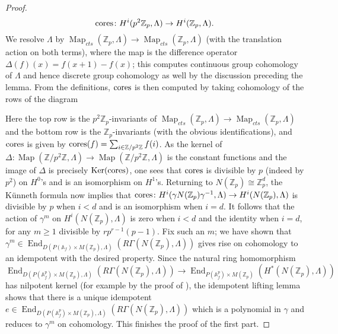 \documentclass{amsart}
\theoremstyle{remark}
\numberwithin{equation}{subsection}
\newcommand{\A}{\AA}
\newcommand{\Z}{\ZZ}
\renewcommand{\AA}{{\mathbb A}}
\newcommand{\ZZ}{{\mathbb Z}}
\newcommand{\Zp}{\Z_p}
\DeclareMathOperator{\End}{End}
\DeclareMathOperator{\Map}{Map}
\renewcommand{\(}{\left(}
\renewcommand{\)}{\right)}
\begin{document}
\begin{proof}
$$ {\rm cores} \colon H^{i}(p^{2}\Zp,\Lambda) \to H^{i}(\Zp,\Lambda). $$
We resolve $\Lambda$ by $\Map_{cts}(\Zp,\Lambda) \to \Map_{cts}(\Zp,\Lambda)$ (with the translation action on both terms), where the map is the difference operator $\Delta(f)(x)=f(x+1)-f(x)$; this computes continuous group cohomology of $\Lambda$ and hence discrete group cohomology as well by the discussion preceding the lemma. From the definitions, ${\rm cores}$ is then computed by taking cohomology of the rows of the diagram
\begin{center}
\end{center}
Here the top row is the $p^{2}\Zp$-invariants of $\Map_{cts}(\Zp,\Lambda) \to \Map_{cts}(\Zp,\Lambda)$ and the bottom row is the $\Zp$-invariants (with the obvious identifications), and ${\rm cores}$ is given by ${\rm cores}(f)=\sum_{i\in \Z/p^{2}\Z}f(i)$. As the kernel of $\Delta \colon \Map(\Z/p^{2}\Z,\Lambda) \to \Map(\Z/p^{2}\Z,\Lambda)$ is the constant functions and the image of $\Delta$ is precisely ${\rm Ker}(\mathrm{cores})$, one sees that ${\rm cores}$ is divisible by $p$ (indeed by $p^{2}$) on $H^{0}$'s and is an isomorphism on $H^{1}$'s. Returning to $N(\Zp)\cong \Zp^{d}$, the K\"unneth formula now implies that $ {\rm cores} \colon H^{i}(\gamma N(\Zp) \gamma^{-1},\Lambda) \to H^{i}(N(\Zp),\Lambda)$ is divisible by $p$ when $i<d$ and is an isomorphism when $i=d$. It follows that the action of $\gamma^m$ on $H^{i}(N(\Zp),\Lambda)$ is zero when $i<d$ and the identity when $i=d$, for any $m\geq 1$ divisible by $rp^{r-1}(p-1)$. Fix such an $m$; we have shown that $\gamma^m \in \End_{D(P(\A_f)\times M(\Zp),\Lambda)}(R\Gamma(N(\Z_p), \Lambda))$ gives rise on cohomology to an idempotent with the desired property. Since the natural ring homomorphism
\[
\End_{D(P(\A_f^p)\times M(\Zp),\Lambda)}(R\Gamma(N(\Z_p), \Lambda)) \to \End_{P(\A_f^p)\times M(\Zp)}(H^{\ast}(N(\Z_p), \Lambda))
\]
has nilpotent kernel (for example by the proof of \cite[Lemma 2.5(2)]{khare-thorne}), the idempotent lifting lemma \cite[Tag 00J9]{stacks-project} shows that there is a unique idempotent $e\in \End_{D(P(\A_f^p)\times M(\Zp),\Lambda)}(R\Gamma(N(\Z_p), \Lambda))$ which is a polynomial in $\gamma$ and reduces to $\gamma^m$ on cohomology. This finishes the proof of the first part.


\end{proof}
\end{document}
